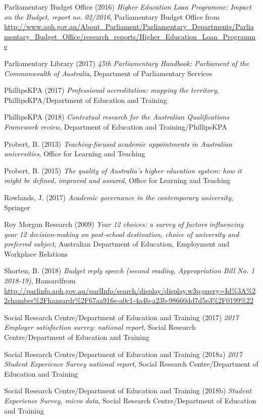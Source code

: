 \documentclass[]{book}
\begin{document}
Parliamentary Budget Office (2016) \emph{Higher Education Loan Programme: Impact on the Budget, report no. 02/2016}, Parliamentary Budget Office from \url{http://www.aph.gov.au/About_Parliament/Parliamentary_Departments/Parliamentary_Budget_Office/research_reports/Higher_Education_Loan_Programme}

Parliamentary Library (2017) \emph{45th Parliamentary Handbook: Parliament of the Commonwealth of Australia}, Department of Parliamentary Services

PhillipsKPA (2017) \emph{Professional accreditation: mapping the territory}, PhillipsKPA/Department of Education and Training

PhillipsKPA (2018) \emph{Contextual research for the Australian Qualifications Framework review}, Department of Education and Training/PhillipsKPA

Probert, B. (2013) \emph{Teaching-focused academic appointments in Australian universities}, Office for Learning and Teaching

Probert, B. (2015) \emph{The quality of Australia's higher education system: how it might be defined, improved and assured}, Office for Learning and Teaching

Rowlands, J. (2017) \emph{Academic governance in the contemporary university}, Springer

Roy Morgan Research (2009) \emph{Year 12 choices: a survey of factors influencing year 12 decision-making on post-school destination, choice of university and preferred subject}, Australian Department of Education, Employment and Workplace Relations

Shorten, B. (2018) \emph{Budget reply speech (second reading, Appropriation Bill No. 1 2018-19)}, Hansardfrom \url{http://parlinfo.aph.gov.au/parlInfo/search/display/display.w3p;query=Id\%3A\%22chamber\%2Fhansardr\%2F67aa916e-a0c1-4a4b-a23b-98660dd7d5e3\%2F0199\%22}

Social Research Centre/Department of Education and Training (2017) \emph{2017 Employer satisfaction survey: national report}, Social Research Centre/Department of Education and Training

Social Research Centre/Department of Education and Training (2018a) \emph{2017 Student Experience Survey national report}, Social Research Centre/Department of Education and Training

\protect\hypertarget{_ENREF_191}{}{}Social Research Centre/Department of Education and Training (2018b) \emph{Student Experience Survey, micro data}, Social Research Centre/Department of Education and Training
\end{document}

